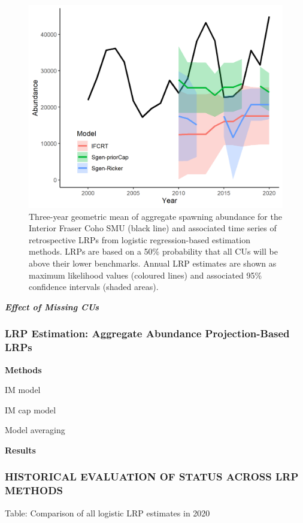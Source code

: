 \documentclass[
]{article}
\begin{document}
\begin{figure}

{\centering \includegraphics[width=0.5\linewidth]{figure/coho_LRP_compareRetro} 

}

\caption{Three-year geometric mean of aggregate spawning abundance for the Interior Fraser Coho SMU (black line) and associated time series of retrospective LRPs from logistic regression-based estimation methods. LRPs are based on a 50\% probability that all CUs will be above their lower benchmarks. Annual LRP estimates are shown as maximum likelihood values (coloured lines) and associated 95\% confidence intervals (shaded areas).}\label{fig:coho-retroLRPs}
\end{figure}

\textbf{\emph{Effect of Missing CUs}}

\hypertarget{lrp-estimation-aggregate-abundance-projection-based-lrps}{%
\subsubsection{LRP Estimation: Aggregate Abundance Projection-Based
LRPs}\label{lrp-estimation-aggregate-abundance-projection-based-lrps}}

\textbf{Methods}

IM model

IM cap model

Model averaging

\textbf{Results}

\hypertarget{historical-evaluation-of-status-across-lrp-methods}{%
\subsubsection{HISTORICAL EVALUATION OF STATUS ACROSS LRP
METHODS}\label{historical-evaluation-of-status-across-lrp-methods}}

Table: Comparison of all logistic LRP estimates in 2020
\end{document}
